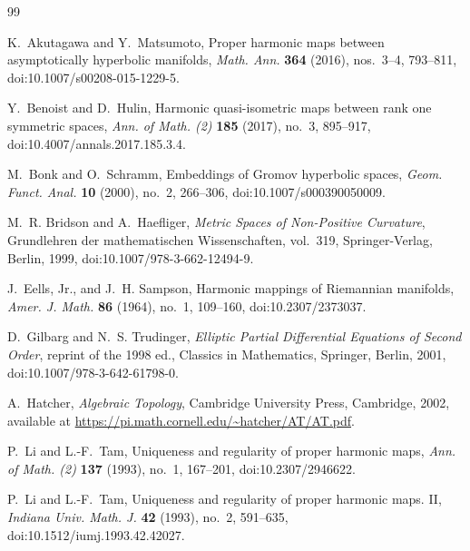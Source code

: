 \documentclass[11pt]{amsart}
\theoremstyle{plain}
\theoremstyle{plain}
\theoremstyle{plain}
\numberwithin{equation}{section}
\begin{document}
\begin{thebibliography}{99}

K.~Akutagawa and Y.~Matsumoto,
\newblock Proper harmonic maps between asymptotically hyperbolic manifolds,
\newblock \emph{Math. Ann.} \textbf{364} (2016), nos.~3--4, 793--811,
\newblock doi:10.1007/s00208-015-1229-5.

Y.~Benoist and D.~Hulin,
\newblock Harmonic quasi-isometric maps between rank one symmetric spaces,
\newblock \emph{Ann. of Math. (2)} \textbf{185} (2017), no.~3, 895--917,
\newblock doi:10.4007/annals.2017.185.3.4.

M.~Bonk and O.~Schramm,
\newblock Embeddings of Gromov hyperbolic spaces,
\newblock \emph{Geom. Funct. Anal.} \textbf{10} (2000), no.~2, 266--306,
\newblock doi:10.1007/s000390050009.

M.~R. Bridson and A.~Haefliger,
\newblock \emph{Metric Spaces of Non-Positive Curvature},
\newblock Grundlehren der mathematischen Wissenschaften, vol.~319,
Springer-Verlag, Berlin, 1999,
\newblock doi:10.1007/978-3-662-12494-9.


J.~Eells, Jr., and J.~H. Sampson,
\newblock Harmonic mappings of Riemannian manifolds,
\newblock \emph{Amer. J. Math.} \textbf{86} (1964), no.~1, 109--160,
\newblock doi:10.2307/2373037.


D.~Gilbarg and N.~S. Trudinger,
\newblock \emph{Elliptic Partial Differential Equations of Second Order},
\newblock reprint of the 1998 ed., Classics in Mathematics, Springer,
Berlin, 2001,
\newblock doi:10.1007/978-3-642-61798-0.

A.~Hatcher,
\newblock \emph{Algebraic Topology},
\newblock Cambridge University Press, Cambridge, 2002,
\newblock available at \url{https://pi.math.cornell.edu/~hatcher/AT/AT.pdf}.



P.~Li and L.-F.~Tam,
\newblock Uniqueness and regularity of proper harmonic maps,
\newblock \emph{Ann. of Math. (2)} \textbf{137} (1993), no.~1, 167--201,
\newblock doi:10.2307/2946622.

P.~Li and L.-F.~Tam,
\newblock Uniqueness and regularity of proper harmonic maps. II,
\newblock \emph{Indiana Univ. Math. J.} \textbf{42} (1993), no.~2, 591--635,
\newblock doi:10.1512/iumj.1993.42.42027.


\end{thebibliography}
\end{document}
